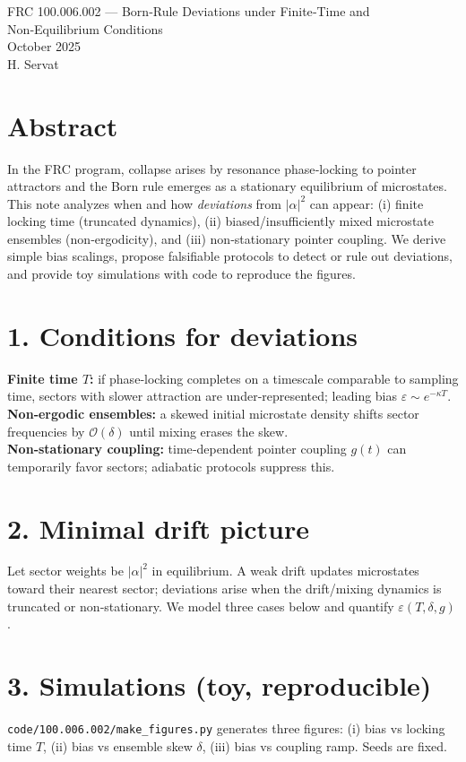\documentclass[10pt]{article}
\begin{document}
\begin{center}
{\Large FRC 100.006.002 — Born‑Rule Deviations under Finite‑Time and Non‑Equilibrium Conditions}\\
{\large October 2025}\\[4pt]
H. Servat
\end{center}

\section*{Abstract}
In the FRC program, collapse arises by resonance phase‑locking to pointer attractors and the Born rule emerges as a stationary equilibrium of microstates. This note analyzes when and how \emph{deviations} from $|\alpha|^2$ can appear: (i) finite locking time (truncated dynamics), (ii) biased/insufficiently mixed microstate ensembles (non‑ergodicity), and (iii) non‑stationary pointer coupling. We derive simple bias scalings, propose falsifiable protocols to detect or rule out deviations, and provide toy simulations with code to reproduce the figures.

\section*{1. Conditions for deviations}
\textbf{Finite time $T$:} if phase‑locking completes on a timescale comparable to sampling time, sectors with slower attraction are under‑represented; leading bias $\varepsilon\!\sim\!e^{-\kappa T}$.\\
\textbf{Non‑ergodic ensembles:} a skewed initial microstate density shifts sector frequencies by $\mathcal{O}(\delta)$ until mixing erases the skew.\\
\textbf{Non‑stationary coupling:} time‑dependent pointer coupling $g(t)$ can temporarily favor sectors; adiabatic protocols suppress this.

\section*{2. Minimal drift picture}
Let sector weights be $|\alpha|^2$ in equilibrium. A weak drift updates microstates toward their nearest sector; deviations arise when the drift/mixing dynamics is truncated or non‑stationary. We model three cases below and quantify $\varepsilon(T,\delta,g)$.

\section*{3. Simulations (toy, reproducible)}
\verb|code/100.006.002/make_figures.py| generates three figures: (i) bias vs locking time $T$, (ii) bias vs ensemble skew $\delta$, (iii) bias vs coupling ramp. Seeds are fixed.
\end{document}
